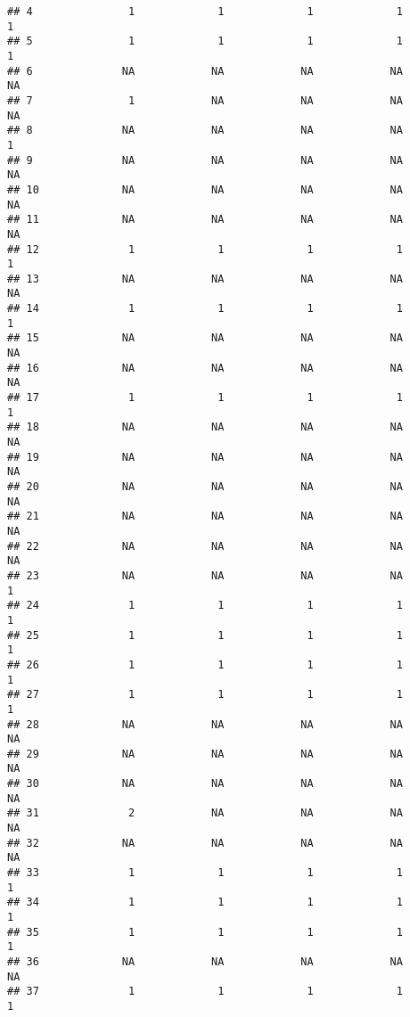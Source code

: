 \documentclass[
]{article}
\begin{document}
\begin{verbatim}
## 4               1             1             1             1             1
## 5               1             1             1             1             1
## 6              NA            NA            NA            NA            NA
## 7               1            NA            NA            NA            NA
## 8              NA            NA            NA            NA             1
## 9              NA            NA            NA            NA            NA
## 10             NA            NA            NA            NA            NA
## 11             NA            NA            NA            NA            NA
## 12              1             1             1             1             1
## 13             NA            NA            NA            NA            NA
## 14              1             1             1             1             1
## 15             NA            NA            NA            NA            NA
## 16             NA            NA            NA            NA            NA
## 17              1             1             1             1             1
## 18             NA            NA            NA            NA            NA
## 19             NA            NA            NA            NA            NA
## 20             NA            NA            NA            NA            NA
## 21             NA            NA            NA            NA            NA
## 22             NA            NA            NA            NA            NA
## 23             NA            NA            NA            NA             1
## 24              1             1             1             1             1
## 25              1             1             1             1             1
## 26              1             1             1             1             1
## 27              1             1             1             1             1
## 28             NA            NA            NA            NA            NA
## 29             NA            NA            NA            NA            NA
## 30             NA            NA            NA            NA            NA
## 31              2            NA            NA            NA            NA
## 32             NA            NA            NA            NA            NA
## 33              1             1             1             1             1
## 34              1             1             1             1             1
## 35              1             1             1             1             1
## 36             NA            NA            NA            NA            NA
## 37              1             1             1             1             1

\end{verbatim}
\end{document}
